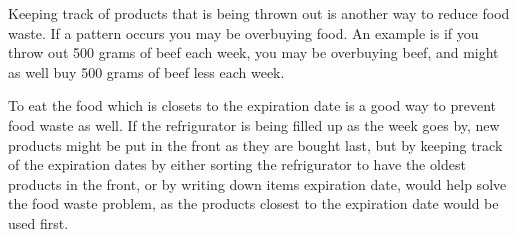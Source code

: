 Keeping track of products that is being thrown out is another way to reduce food waste. If a pattern occurs you may be overbuying food. An example is if you throw out 500 grams of beef each week, you may be overbuying beef, and might as well buy 500 grams of beef less each week. %

To eat the food which is closets to the expiration date is a good way to prevent food waste as well. If the refrigurator is being filled up as the week goes by, new products might be put in the front as they are bought last, but by keeping track of the expiration dates by either sorting the refrigurator to have the oldest products in the front, or by writing down items expiration date, would help solve the food waste problem, as the products closest to the expiration date would be used first.

